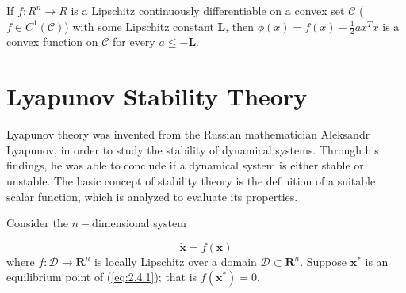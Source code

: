     \begin{theorem}\label{thr:2.2}
        \cite{ZSCSP} If $f:R^n \to  R$ is a Lipschitz continuously differentiable on a convex set $\mathcal{C}$\hspace{1.0mm} ($f \in C^1(\mathcal{C})$) with some Lipschitz constant $\mathbf{L}$, then $\phi(x) = f(x) - \frac{1}{2}ax^Tx$ is a convex function on $\mathcal{C}$ for every $a \leq -\mathbf{L}$.
    \end{theorem}

\section{Lyapunov Stability Theory}

    Lyapunov theory was invented from the Russian mathematician Aleksandr Lyapunov, in order to study the stability of dynamical systems. Through his findings, he was able to conclude if a dynamical system is either stable or unstable. The basic concept of stability theory is the definition of a suitable scalar function, which is analyzed to evaluate its properties.

    Consider the $n-$dimensional system

    \begin{equation}\label{eq:2.4.1}
        \dot{\boldsymbol{x}} = f(\boldsymbol{x})
    \end{equation}
    where $f: \mathcal{D} \to \mathbf{R}^n$ is locally Lipschitz over a domain $\mathcal{D} \subset \mathbf{R}^n$. Suppose $\boldsymbol{x}^*$ is an equilibrium point of (\ref{eq:2.4.1}); that is $f(\boldsymbol{x}^*) = 0$.

